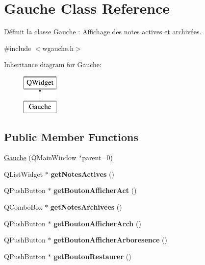 \hypertarget{class_gauche}{}\section{Gauche Class Reference}
\label{class_gauche}


Définit la classe \hyperlink{class_gauche}{Gauche} \+: Affichage des notes actives et archivées.  




{\ttfamily \#include $<$wgauche.\+h$>$}

Inheritance diagram for Gauche\+:\begin{figure}[H]
\begin{center}
\leavevmode
\includegraphics[height=2.000000cm]{class_gauche}
\end{center}
\end{figure}
\subsection*{Public Member Functions}
\begin{DoxyCompactItemize}
\item 
\hyperlink{class_gauche_a484580ec6e2985ffea805729dcea558e}{Gauche} (Q\+Main\+Window $\ast$parent=0)
\item 
\mbox{\label{class_gauche_a297cbb2449edcbd05139ebd8a56982ba}} 
Q\+List\+Widget $\ast$ {\bfseries get\+Notes\+Actives} ()
\item 
\mbox{\label{class_gauche_a2c63373c0cf72892d9cd1b30fa7f6967}} 
Q\+Push\+Button $\ast$ {\bfseries get\+Bouton\+Afficher\+Act} ()
\item 
\mbox{\label{class_gauche_a027ffd7a9f33c6a72e0e729720884c69}} 
Q\+Combo\+Box $\ast$ {\bfseries get\+Notes\+Archivees} ()
\item 
\mbox{\label{class_gauche_a059358cfcb5b29694a92b2437764ee69}} 
Q\+Push\+Button $\ast$ {\bfseries get\+Bouton\+Afficher\+Arch} ()
\item 
\mbox{\label{class_gauche_a25ef786bff4a19a90f33d68c79752799}} 
Q\+Push\+Button $\ast$ {\bfseries get\+Bouton\+Afficher\+Arboresence} ()
\item 
\mbox{\label{class_gauche_ad693cecd6164f84faecec5ecd8403cce}} 
Q\+Push\+Button $\ast$ {\bfseries get\+Bouton\+Restaurer} ()
\end{DoxyCompactItemize}


